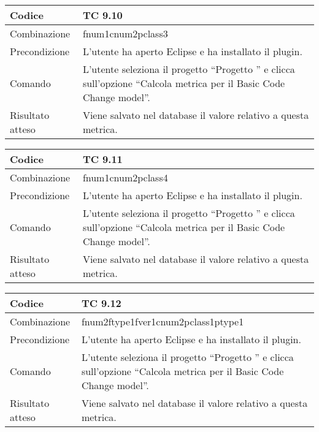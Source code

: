\begin{table}[ht]
\begin{tabular}{|p{3cm}|p{9cm}|}
\hline
\cellcolor{lightgray}Codice				& TC 9.10								\\
\hline
\cellcolor{lightgray}Combinazione		& fnum1cnum2pclass3									\\
\hline
\cellcolor{lightgray}Precondizione		& L'utente ha aperto Eclipse e ha installato il plugin.		\\
\hline
\cellcolor{lightgray}Comando			& L'utente seleziona il progetto ``Progetto ''  e clicca sull'opzione ``Calcola metrica per il Basic Code Change model''.	\\
\hline
\cellcolor{lightgray}Risultato atteso	& Viene salvato nel database il valore relativo a questa metrica.\\
\hline
\end{tabular}
\end{table}

\begin{table}[ht]
\begin{tabular}{|p{3cm}|p{9cm}|}
\hline
\cellcolor{lightgray}Codice				& TC 9.11								\\
\hline
\cellcolor{lightgray}Combinazione		& fnum1cnum2pclass4									\\
\hline
\cellcolor{lightgray}Precondizione		& L'utente ha aperto Eclipse e ha installato il plugin.		\\
\hline
\cellcolor{lightgray}Comando			& L'utente seleziona il progetto ``Progetto ''  e clicca sull'opzione ``Calcola metrica per il Basic Code Change model''.	\\
\hline
\cellcolor{lightgray}Risultato atteso	& Viene salvato nel database il valore relativo a questa metrica.\\
\hline
\end{tabular}
\end{table}

\begin{table}[ht]
\begin{tabular}{|p{3cm}|p{9cm}|}
\hline
\cellcolor{lightgray}Codice				& TC 9.12								\\
\hline
\cellcolor{lightgray}Combinazione		& fnum2ftype1fver1cnum2pclass1ptype1									\\
\hline
\cellcolor{lightgray}Precondizione		& L'utente ha aperto Eclipse e ha installato il plugin.		\\
\hline
\cellcolor{lightgray}Comando			& L'utente seleziona il progetto ``Progetto ''  e clicca sull'opzione ``Calcola metrica per il Basic Code Change model''.	\\
\hline
\cellcolor{lightgray}Risultato atteso	& Viene salvato nel database il valore relativo a questa metrica.\\
\hline
\end{tabular}
\end{table}

